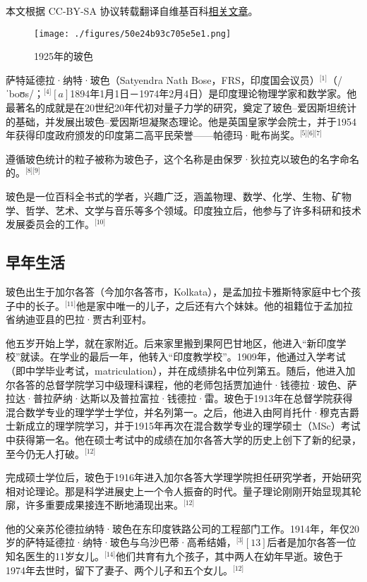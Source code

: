 
本文根据 CC-BY-SA 协议转载翻译自维基百科\href{https://en.wikipedia.org/wiki/Satyendra_Nath_Bose}{相关文章}。

\begin{figure}[ht]
\centering
\texttt{[image: ./figures/50e24b93c705e5e1.png]}
\caption{1925年的玻色} \label{fig_BOSE_8}
\end{figure}
萨特延德拉·纳特·玻色（Satyendra Nath Bose，FRS，印度国会议员）\(^\text{[1]}\)（/ˈboʊs/；\(^\text{[4]}[a]\)1894年1月1日－1974年2月4日）是印度理论物理学家和数学家。他最著名的成就是在20世纪20年代初对量子力学的研究，奠定了玻色–爱因斯坦统计的基础，并发展出玻色–爱因斯坦凝聚态理论。他是英国皇家学会院士，并于1954年获得印度政府颁发的印度第二高平民荣誉——帕德玛·毗布尚奖。\(^\text{[5][6][7]}\)

遵循玻色统计的粒子被称为玻色子，这个名称是由保罗·狄拉克以玻色的名字命名的。\(^\text{[8][9]}\)

玻色是一位百科全书式的学者，兴趣广泛，涵盖物理、数学、化学、生物、矿物学、哲学、艺术、文学与音乐等多个领域。印度独立后，他参与了许多科研和技术发展委员会的工作。\(^\text{[10]}\)
\subsection{早年生活}
玻色出生于加尔各答（今加尔各答市，Kolkata），是孟加拉卡雅斯特家庭中七个孩子中的长子。\(^\text{[11]}\)他是家中唯一的儿子，之后还有六个妹妹。他的祖籍位于孟加拉省纳迪亚县的巴拉·贾古利亚村。

他五岁开始上学，就在家附近。后来家里搬到果阿巴甘地区，他进入“新印度学校”就读。在学业的最后一年，他转入“印度教学校”。1909年，他通过入学考试（即中学毕业考试，matriculation），并在成绩排名中位列第五。随后，他进入加尔各答的总督学院学习中级理科课程，他的老师包括贾加迪什·钱德拉·玻色、萨拉达·普拉萨纳·达斯以及普拉富拉·钱德拉·雷。玻色于1913年在总督学院获得混合数学专业的理学学士学位，并名列第一。之后，他进入由阿肖托什·穆克吉爵士新成立的理学院学习，并于1915年再次在混合数学专业的理学硕士（MSc）考试中获得第一名。他在硕士考试中的成绩在加尔各答大学的历史上创下了新的纪录，至今仍无人打破。\(^\text{[12]}\)

完成硕士学位后，玻色于1916年进入加尔各答大学理学院担任研究学者，开始研究相对论理论。那是科学进展史上一个令人振奋的时代。量子理论刚刚开始显现其轮廓，许多重要成果接连不断地涌现出来。\(^\text{[12]}\)

他的父亲苏伦德拉纳特·玻色在东印度铁路公司的工程部门工作。1914年，年仅20岁的萨特延德拉·纳特·玻色与乌沙巴蒂·高希结婚，\(^\text{[3]}[13]\)后者是加尔各答一位知名医生的11岁女儿。\(^\text{[14]}\)他们共育有九个孩子，其中两人在幼年早逝。玻色于1974年去世时，留下了妻子、两个儿子和五个女儿。\(^\text{[12]}\)

